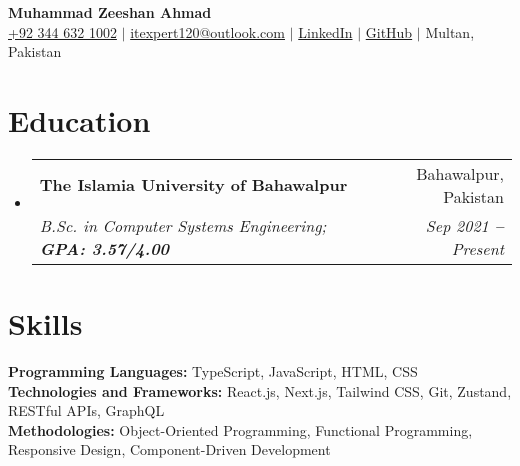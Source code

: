 \documentclass[letterpaper,11pt]{article}
\makeatletter
\newcommand{\resumeEducationHeading}[4]{
  \vspace{-2pt}\item
    \begin{tabular*}{0.97\textwidth}[t]{l@{\extracolsep{\fill}}r}
      \textbf{#1} & #2 \\
      \textit{\small#3} & \textit{\small#4} \\
    \end{tabular*}\vspace{-5pt}
}
\newcommand{\resumeSubHeadingListStart}{\begin{itemize}[leftmargin=0.15in, label={}]}
\newcommand{\resumeSubHeadingListEnd}{\end{itemize}}
\makeatother
\begin{document}

\begin{center}
  \textbf{\Huge Muhammad Zeeshan Ahmad} \\ \vspace{3pt}
  \small
  \faMobile \hspace{.5pt} \href{tel:923446321002}{+92 344 632 1002}
  $|$
  \faAt \hspace{.5pt} \href{mailto:itexpert120@outlook.com}{itexpert120@outlook.com}
  $|$
  \faLinkedinSquare \hspace{.5pt} \href{https://www.linkedin.com/in/itexpert120}{LinkedIn}
  $|$
  \faGithub \hspace{.5pt} \href{https://github.com/itexpert120}{GitHub}
  $|$
  \faMapMarker \hspace{.5pt} {Multan, Pakistan}
\end{center}


\section{Education}
\vspace{3pt}
\resumeSubHeadingListStart

\resumeEducationHeading
{The Islamia University of Bahawalpur}{Bahawalpur, Pakistan}
{B.Sc. in Computer Systems Engineering; \textbf{GPA: 3.57/4.00}}{Sep 2021 \textbf{--} Present}

\resumeSubHeadingListEnd


\section{Skills}
\vspace{2pt}
\resumeSubHeadingListStart
\small{\item{
              \textbf{Programming Languages:} TypeScript, JavaScript, HTML, CSS \\ \vspace{3pt}
              \textbf{Technologies and Frameworks:} React.js, Next.js, Tailwind CSS, Git, Zustand, RESTful APIs, GraphQL \\ \vspace{3pt}
              \textbf{Methodologies:} Object-Oriented Programming, Functional Programming, Responsive Design, Component-Driven Development \\ \vspace{3pt}
        }}
\resumeSubHeadingListEnd
\end{document}
